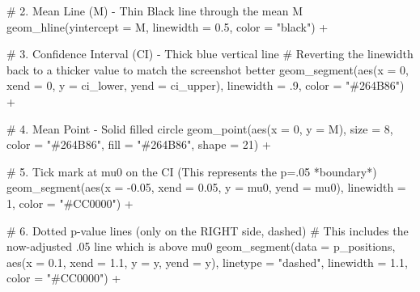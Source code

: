 \documentclass[
  letterpaper,
  DIV=11,
  numbers=noendperiod]{scrreprt}
\newenvironment{Shaded}{\begin{snugshade}}{\end{snugshade}}
\newcommand{\AttributeTok}[1]{\textcolor[rgb]{0.40,0.45,0.13}{#1}}
\newcommand{\CommentTok}[1]{\textcolor[rgb]{0.37,0.37,0.37}{#1}}
\newcommand{\DecValTok}[1]{\textcolor[rgb]{0.68,0.00,0.00}{#1}}
\newcommand{\FloatTok}[1]{\textcolor[rgb]{0.68,0.00,0.00}{#1}}
\newcommand{\FunctionTok}[1]{\textcolor[rgb]{0.28,0.35,0.67}{#1}}
\newcommand{\NormalTok}[1]{\textcolor[rgb]{0.00,0.23,0.31}{#1}}
\newcommand{\SpecialCharTok}[1]{\textcolor[rgb]{0.37,0.37,0.37}{#1}}
\newcommand{\StringTok}[1]{\textcolor[rgb]{0.13,0.47,0.30}{#1}}
\begin{document}
\begin{Shaded}
\begin{Highlighting}[]
  \CommentTok{\# 2. Mean Line (M) {-} Thin Black line through the mean M}
  \FunctionTok{geom\_hline}\NormalTok{(}\AttributeTok{yintercept =}\NormalTok{ M, }\AttributeTok{linewidth =} \FloatTok{0.5}\NormalTok{, }\AttributeTok{color =} \StringTok{"black"}\NormalTok{) }\SpecialCharTok{+}
  
  \CommentTok{\# 3. Confidence Interval (CI) {-} Thick blue vertical line}
  \CommentTok{\# Reverting the linewidth back to a thicker value to match the screenshot better}
  \FunctionTok{geom\_segment}\NormalTok{(}\FunctionTok{aes}\NormalTok{(}\AttributeTok{x =} \DecValTok{0}\NormalTok{, }\AttributeTok{xend =} \DecValTok{0}\NormalTok{, }\AttributeTok{y =}\NormalTok{ ci\_lower, }\AttributeTok{yend =}\NormalTok{ ci\_upper),}
               \AttributeTok{linewidth =}\NormalTok{ .}\DecValTok{9}\NormalTok{, }\AttributeTok{color =} \StringTok{"\#264B86"}\NormalTok{) }\SpecialCharTok{+} 

  \CommentTok{\# 4. Mean Point {-} Solid filled circle}
  \FunctionTok{geom\_point}\NormalTok{(}\FunctionTok{aes}\NormalTok{(}\AttributeTok{x =} \DecValTok{0}\NormalTok{, }\AttributeTok{y =}\NormalTok{ M),}
             \AttributeTok{size =} \DecValTok{8}\NormalTok{, }\AttributeTok{color =} \StringTok{"\#264B86"}\NormalTok{, }\AttributeTok{fill =} \StringTok{"\#264B86"}\NormalTok{, }\AttributeTok{shape =} \DecValTok{21}\NormalTok{) }\SpecialCharTok{+} 

  \CommentTok{\# 5. Tick mark at mu0 on the CI (This represents the p=.05 *boundary*)}
  \FunctionTok{geom\_segment}\NormalTok{(}\FunctionTok{aes}\NormalTok{(}\AttributeTok{x =} \SpecialCharTok{{-}}\FloatTok{0.05}\NormalTok{, }\AttributeTok{xend =} \FloatTok{0.05}\NormalTok{, }\AttributeTok{y =}\NormalTok{ mu0, }\AttributeTok{yend =}\NormalTok{ mu0), }
               \AttributeTok{linewidth =} \DecValTok{1}\NormalTok{, }\AttributeTok{color =} \StringTok{"\#CC0000"}\NormalTok{) }\SpecialCharTok{+}
  
  \CommentTok{\# 6. Dotted p{-}value lines (only on the RIGHT side, dashed)}
  \CommentTok{\# This includes the now{-}adjusted .05 line which is above mu0}
  \FunctionTok{geom\_segment}\NormalTok{(}\AttributeTok{data =}\NormalTok{ p\_positions,}
               \FunctionTok{aes}\NormalTok{(}\AttributeTok{x =} \FloatTok{0.1}\NormalTok{, }\AttributeTok{xend =} \FloatTok{1.1}\NormalTok{, }\AttributeTok{y =}\NormalTok{ y, }\AttributeTok{yend =}\NormalTok{ y),}
               \AttributeTok{linetype =} \StringTok{"dashed"}\NormalTok{, }\AttributeTok{linewidth =} \FloatTok{1.1}\NormalTok{, }\AttributeTok{color =} \StringTok{"\#CC0000"}\NormalTok{) }\SpecialCharTok{+}
  

\end{Highlighting}
\end{Shaded}
\end{document}
